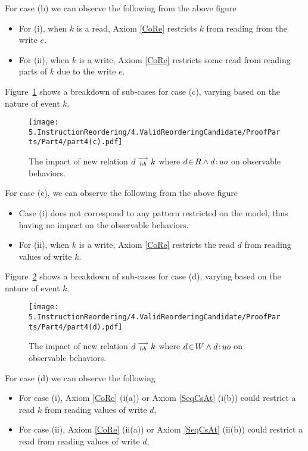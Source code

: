     For case (b) we can observe the following from the above figure 
    \begin{itemize}
        \item For (i), when $k$ is a read, Axiom \ref{CoRe} restricts $k$ from reading from the write $e$. 
        \item For (ii), when $k$ is a write, Axiom \ref{CoRe} restricts some read from reading parts of $k$ due to the write $e$.   
    \end{itemize}

    Figure~\ref{reord:case3} shows a breakdown of sub-cases for case (c), varying based on the nature of event $k$.
    \begin{figure}[H]
        \centering
        \texttt{[image: 5.InstructionReordering/4.ValidReorderingCandidate/ProofParts/Part4/part4(c).pdf]}
        \caption{The impact of new relation $d\stackrel{\longrightarrow}{_{hb}}k$ where $d\!\in\!R \wedge d\!:\!\textit{uo}$ on observable behaviors.}
        \label{reord:case3}
    \end{figure}
    
    For case (c), we can observe the following from the above figure
    \begin{itemize}
        \item Case (i) does not correspond to any pattern restricted on the model, thus having no impact on the observable behaviors. 
        \item For (ii), when $k$ is a write, Axiom \ref{CoRe} restricts the read $d$ from reading values of write $k$. 
    \end{itemize}

    Figure~\ref{reord:case4} shows a breakdown of sub-cases for case (d), varying based on the nature of event $k$.
    \begin{figure}[H]
        \centering
        \texttt{[image: 5.InstructionReordering/4.ValidReorderingCandidate/ProofParts/Part4/part4(d).pdf]}
        \caption{The impact of new relation $d\stackrel{\longrightarrow}{_{hb}}k$ where $d\!\in\!W \wedge d\!:\!\textit{uo}$ on observable behaviors.}
        \label{reord:case4}
    \end{figure}

    For case (d) we can observe the following 
    \begin{itemize}
        \item For case (i), Axiom \ref{CoRe} (i(a)) or Axiom \ref{SeqCsAt} (i(b)) could restrict a read $k$ from reading values of write $d$, 
        \item For case (ii), Axiom \ref{CoRe} (ii(a)) or Axiom \ref{SeqCsAt} (ii(b)) could restrict a read from reading values of write $d$, 
    \end{itemize}
  

